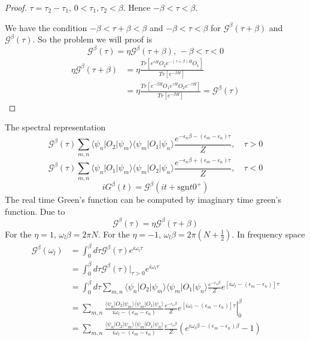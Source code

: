 \documentclass[a4paper,11pt]{article}
\newtheorem{proof}{proof}[section]
\begin{document}
\begin{proof}
  $\tau=\tau_2-\tau_1$, $0<\tau_1,\tau_2<\beta$. Hence $-\beta<\tau<\beta$.

  We have the condition $-\beta<\tau+\beta<\beta$ and $-\beta<\tau<\beta$ for $\mathcal{G}^\beta(\tau+\beta)$ and $\mathcal{G}^\beta(\tau)$. So the problem we will proof is
  \begin{equation*}
    \mathcal{G}^\beta(\tau)=\eta\mathcal{G}^\beta(\tau+\beta),\,-\beta<\tau<0
  \end{equation*}
  \begin{equation*}
    \begin{split}
       \eta\mathcal{G}^\beta(\tau+\beta)&=\eta\frac{Tr[e^{\tau H}O_2e^{-(\tau+\beta)H}O_1]}{Tr[e^{-\beta H}]}\\
         &=\eta\frac{Tr[e^{-\beta H}O_1e^{\tau H}O_2e^{-\tau H}]}{Tr[e^{-\beta H}]}=\mathcal{G}^\beta(\tau)
    \end{split}
  \end{equation*}
\end{proof}
The spectral representation
\begin{equation*}
  \mathcal{G}^\beta(\tau)\sum_{m,n}\langle\psi_n|O_2|\psi_m\rangle\langle\psi_m|O_1|\psi_n\rangle\frac{e^{-\epsilon_n\beta-(\epsilon_m-\epsilon_n)\tau}}{Z},\quad\tau>0
\end{equation*}
\begin{equation*}
  \mathcal{G}^\beta(\tau)\sum_{m,n}\langle\psi_n|O_1|\psi_m\rangle\langle\psi_m|O_2|\psi_n\rangle\frac{e^{-\epsilon_n\beta+(\epsilon_m-\epsilon_n)\tau}}{Z},\quad\tau<0
\end{equation*}
\begin{equation*}
  iG^\beta(t)=\mathcal{G}^\beta(it+\mathrm{sgn} t0^+)
\end{equation*}
The real time Green's function can be computed by imaginary time green's function. Due to
\begin{equation*}
  \mathcal{G}^\beta(\tau)=\eta\mathcal{G}^\beta(\tau+\beta)
\end{equation*}
For the $\eta=1$, $\omega_l\beta=2\pi N$. For the $\eta=-1$, $\omega_l\beta=2\pi(N+\frac{1}{2})$. In frequency space
\begin{equation*}
  \begin{split}
     \mathcal{G}^\beta(\omega_l)&=\int_{0}^{\beta}d\tau\mathcal{G}^\beta(\tau)e^{i\omega_l\tau}\\
       &=\int_{0}^\beta d\tau \mathcal{G}^\beta(\tau)|_{\tau>0}e^{i\omega_l\tau}\\
       &=\int_{0}^{\beta} d\tau \sum_{m,n}\langle\psi_n|O_2|\psi_m\rangle\langle\psi_m|O_1|\psi_n\rangle\frac{e^{-\epsilon_n\beta}}{Z}e^{[i\omega_l-(\epsilon_m-\epsilon_n)]\tau}\\
       &=\sum_{m,n}\frac{\langle\psi_n|O_2|\psi_m\rangle\langle\psi_m|O_1|\psi_n\rangle}{i\omega_l-(\epsilon_m-\epsilon_n)}\frac{e^{-\epsilon_n\beta}}{Z}\left.e^{[i\omega_l-(\epsilon_m-\epsilon_n)]\tau}\right|_{0}^{\beta}\\
       &=\sum_{m,n}\frac{\langle\psi_n|O_2|\psi_m\rangle\langle\psi_m|O_1|\psi_n\rangle}{i\omega_l-(\epsilon_m-\epsilon_n)}\frac{e^{-\epsilon_n\beta}}{Z}(e^{i\omega_l\beta-(\epsilon_m-\epsilon_n)\beta}-1)
  \end{split}
\end{equation*}
\end{document}
